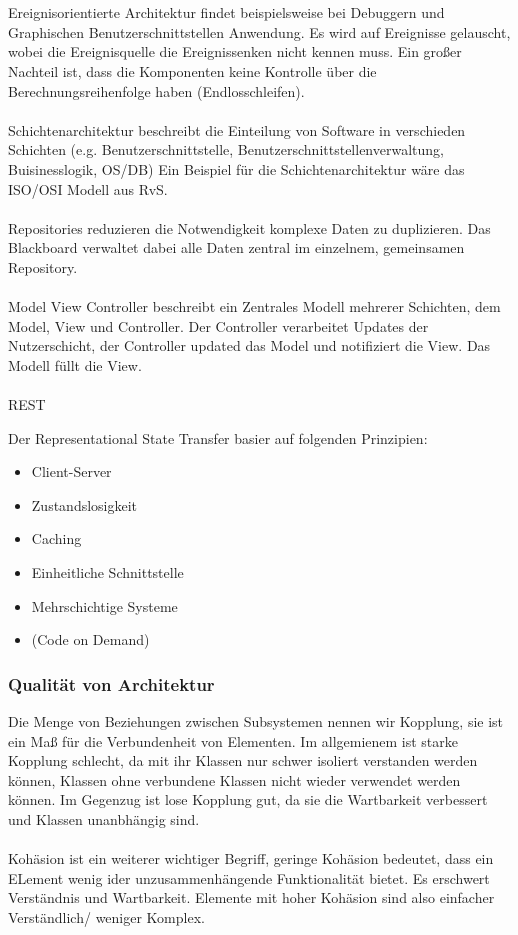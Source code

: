 \\ \\
Ereignisorientierte Architektur findet beispielsweise bei Debuggern und Graphischen Benutzerschnittstellen Anwendung.
Es wird auf Ereignisse gelauscht, wobei die Ereignisquelle die Ereignissenken nicht kennen muss.
Ein großer Nachteil ist, dass die Komponenten keine Kontrolle über die Berechnungsreihenfolge haben (Endlosschleifen).
\\ \\
Schichtenarchitektur beschreibt die Einteilung von Software in verschieden Schichten 
(e.g. Benutzerschnittstelle, Benutzerschnittstellenverwaltung, Buisinesslogik, OS/DB)
Ein Beispiel für die Schichtenarchitektur wäre das ISO/OSI Modell aus RvS.
\\ \\
Repositories reduzieren die Notwendigkeit komplexe Daten zu duplizieren.
Das Blackboard verwaltet dabei alle Daten zentral im einzelnem, gemeinsamen Repository.
\\ \\
Model View Controller beschreibt ein Zentrales Modell mehrerer Schichten, dem Model, View und Controller.
Der Controller verarbeitet Updates der Nutzerschicht, der Controller updated das Model und notifiziert die View.
Das Modell füllt die View.
\\ \\
REST

Der Representational State Transfer basier auf folgenden Prinzipien:
\begin{itemize}
    \item Client-Server
    \item Zustandslosigkeit
    \item Caching
    \item Einheitliche Schnittstelle
    \item Mehrschichtige Systeme
    \item (Code on Demand)
\end{itemize}

\subsubsection{Qualität von Architektur}

Die Menge von Beziehungen zwischen Subsystemen nennen wir Kopplung, sie ist ein Maß für die Verbundenheit von Elementen.
Im allgemienem ist starke Kopplung schlecht, da mit ihr Klassen nur schwer isoliert verstanden werden können, Klassen
ohne verbundene Klassen nicht wieder verwendet werden können.
Im Gegenzug ist lose Kopplung gut, da sie die Wartbarkeit verbessert und Klassen unanbhängig sind.
\\ \\
Kohäsion ist ein weiterer wichtiger Begriff, geringe Kohäsion bedeutet, dass ein ELement wenig ider unzusammenhängende 
Funktionalität bietet.
Es erschwert Verständnis und Wartbarkeit.
Elemente mit hoher Kohäsion sind also einfacher Verständlich/ weniger Komplex.

